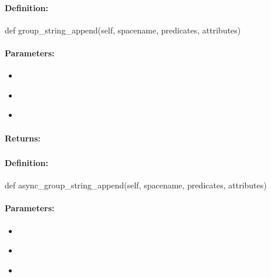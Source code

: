 \paragraph{Definition:}
\begin{pythoncode}
def group_string_append(self, spacename, predicates, attributes)
\end{pythoncode}

\paragraph{Parameters:}
\begin{itemize}[noitemsep]
\item {}\\

\item {}\\

\item {}\\

\end{itemize}

\paragraph{Returns:}


\pagebreak
\subsubsection{}
\label{api:python:async_group_string_append}


\paragraph{Definition:}
\begin{pythoncode}
def async_group_string_append(self, spacename, predicates, attributes)
\end{pythoncode}

\paragraph{Parameters:}
\begin{itemize}[noitemsep]
\item {}\\

\item {}\\

\item {}\\

\end{itemize}


